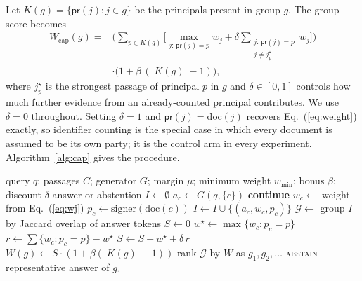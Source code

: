 \documentclass[lettersize,journal]{IEEEtran}
\newcommand{\prin}{\mathsf{pr}}
\begin{document}
Let $K(g) = \{\prin(j) : j \in g\}$ be the principals present in group $g$. The group score
becomes
\begin{equation}
\begin{split}
W_{\mathrm{cap}}(g) ={}& \Big(\sum_{p \in K(g)} \Big[\max_{j:\,\prin(j) = p} w_j
 + \delta \!\!\sum_{\substack{j:\,\prin(j) = p\\ j \neq j_p^{\star}}}\!\! w_j \Big]\Big)\\
 &\cdot \big(1 + \beta\,(|K(g)| - 1)\big),
\end{split}
\label{eq:indweight}
\end{equation}
where $j_p^{\star}$ is the strongest passage of principal $p$ in $g$ and $\delta \in [0,1]$
controls how much further evidence from an already-counted principal contributes. We use
$\delta = 0$ throughout. Setting $\delta = 1$ and $\prin(j) = \mathrm{doc}(j)$ recovers
Eq.~(\ref{eq:weight}) exactly, so identifier counting is the special case in which every
document is assumed to be its own party; it is the control arm in every experiment.
Algorithm~\ref{alg:cap} gives the procedure.

\begin{algorithm}[t]
\caption{Isolate-then-aggregate with a per-principal cap}
\label{alg:cap}
\begin{algorithmic}[1]
\Require query $q$; passages $C$; generator $G$; margin $\mu$; minimum weight $w_{\min}$;
bonus $\beta$; discount $\delta$
\Ensure answer or abstention
\State $I \gets \emptyset$
  \State $a_c \gets G(q, \{c\})$ 
   \State \textbf{continue} \EndIf
  \State $w_c \gets$ weight from Eq.~(\ref{eq:wj})
  \State $p_c \gets \mathrm{signer}(\mathrm{doc}(c))$ 
  \State $I \gets I \cup \{(a_c, w_c, p_c)\}$
\EndFor
\State $\mathcal{G} \gets$ group $I$ by Jaccard overlap of answer tokens
  \State $S \gets 0$
     \State $w^{\star} \gets \max\{w_c : p_c = p\}$
     \State $r \gets \sum\{w_c : p_c = p\} - w^{\star}$
     \State $S \gets S + w^{\star} + \delta\, r$
  \EndFor
  \State $W(g) \gets S \cdot (1 + \beta(|K(g)| - 1))$
\EndFor
\State rank $\mathcal{G}$ by $W$ as $g_1, g_2, \dots$
  \State \Return \textsc{abstain}
\EndIf
\State \Return representative answer of $g_1$
\end{algorithmic}
\end{algorithm}
\end{document}
